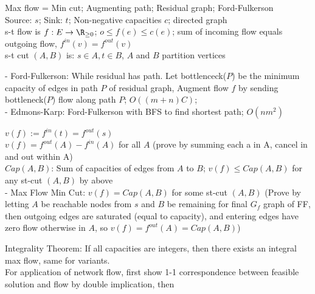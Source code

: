 \documentclass[10pt]{CheatSheet/hw}
\begin{document}
\begin{multicols*}{5}
 Max flow = Min cut; Augmenting path; Residual graph; Ford-Fulkerson\\
Source: $s$; Sink: $t$; Non-negative capacities $c$; directed graph\\
s-t flow is $f: E\to\R_{\geq 0}$; $o\le f(e)\le c(e)$; sum of incoming flow equals outgoing flow, $f^{in}(v)=f^{out}(v)$\\
s-t cut $(A,B)$ is: $s\in A, t\in B$, $A$ and $B$ partition vertices

- Ford-Fulkerson: While residual has path. Let bottlenceck($P$) be the minimum capacity of edges in path $P$ of residual graph, Augment flow $f$ by sending bottleneck($P$) flow along path $P$; $O((m+n)C)$;\\
- Edmons-Karp: Ford-Fulkerson with BFS to find shortest path; $O(nm^2)$

$v(f):=f^{in}(t)=f^{out}(s)$\\
$v(f)=f^{out}(A)-f^{in}(A)$ for all $A$ (prove by summing each a in A, cancel in and out within A)\\
$Cap(A,B)$: Sum of capacities of edges from $A$ to $B$; $v(f)\le Cap(A,B)$ for any st-cut $(A,B)$ by above\\
- Max Flow Min Cut: $v(f)=Cap(A,B)$ for some st-cut $(A,B)$ (Prove by letting $A$ be reachable nodes from $s$ and $B$ be remaining for final $G_f$ graph of FF, then outgoing edges are saturated (equal to capacity), and entering edges have zero flow otherwise in $A$, so $v(f)=f^{out}(A)=Cap(A,B)$)

Integrality Theorem: If all capacities are integers, then there exists an integral max flow, same for variants.\\
For application of network flow, first show 1-1 correspondence between feasible solution and flow by double implication, then


\end{multicols*}
\end{document}
